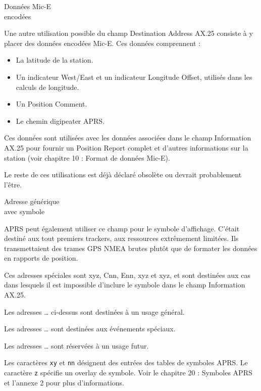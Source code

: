\begin{aprssideblock}{Données Mic-E\\encodées}
\label{donnuxe9es-mic-e-encoduxe9es}
Une autre utilisation possible du champ Destination Address AX.25
consiste à y placer des données encodées Mic-E. Ces données comprennent :

\begin{itemize}
\tightlist
\item
  La latitude de la station.
\item
  Un indicateur West/East et un indicateur Longitude Offset, utilisés
  dans les calculs de longitude.
\item
  Un Position Comment.
\item
  Le chemin digipeater APRS.
\end{itemize}

Ces données sont utilisées avec les données associées dans le champ
Information AX.25 pour fournir un Position Report complet et d'autres
informations sur la station (voir chapitre 10 : Format de données
Mic-E).

Le reste de ces utilisations est déjà déclaré obsolète ou devrait
probablement l'être.
\end{aprssideblock}

\begin{aprssideblock}{Adresse générique\\avec symbole}
\label{adresse-guxe9nuxe9rique-avec-symbole}
APRS peut également utiliser ce champ pour le symbole d'affichage.
C'était destiné aux tout premiers trackers, aux ressources
extrêmement limitées. Ils transmettaient des trames GPS NMEA brutes
plutôt que de formater les données en rapports de position.

Ces adresses spéciales sont
{\ttfamily {}xyz},
{\ttfamily {}Cnn},
{\ttfamily {}Enn},
{\ttfamily {}xyz} et
{\ttfamily {}xyz},
et sont destinées aux cas dans lesquels il est impossible d'inclure le
symbole dans le champ Information AX.25.

Les adresses {\ttfamily {}…} ci-dessus sont destinées à un usage
général.

Les adresses {\ttfamily {}…} sont destinées aux événements
spéciaux.

Les adresses {\ttfamily {}…} sont réservées à un usage futur.

Les caractères \texttt{xy} et \texttt{nn} désignent des entrées des
tables de symboles APRS. Le caractère \texttt{z} spécifie un overlay de
symbole. Voir le chapitre 20 : Symboles APRS et l'annexe 2 pour plus
d'informations.
\end{aprssideblock}


